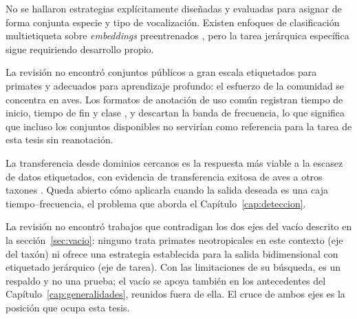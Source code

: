  No se hallaron estrategias explícitamente
diseñadas y evaluadas para asignar de forma conjunta especie y tipo de
vocalización. Existen enfoques de clasificación multietiqueta sobre
\textit{embeddings} preentrenados \citep{kath_leveraging_2024}, pero la tarea
jerárquica específica sigue requiriendo desarrollo propio.

 La revisión no encontró conjuntos públicos
a gran escala etiquetados para primates y adecuados para aprendizaje profundo:
el esfuerzo de la comunidad se concentra en aves. Los formatos de anotación de
uso común registran tiempo de inicio, tiempo de fin y clase
\citep{nolasco_learning_2023}, y descartan la banda de frecuencia, lo que
significa que incluso los conjuntos disponibles no servirían como referencia
para la tarea de esta tesis sin reanotación.

 La transferencia desde dominios cercanos es la
respuesta más viable a la escasez de datos etiquetados, con evidencia de
transferencia exitosa de aves a otros taxones
\citep{kath_leveraging_2024,nolasco_learning_2023}. Queda abierto cómo aplicarla
cuando la salida deseada es una caja tiempo--frecuencia, el problema que aborda
el
Capítulo~\ref{cap:deteccion}.

La revisión no encontró trabajos que contradigan los dos ejes del vacío descrito
en la sección~\ref{sec:vacio}: ninguno trata primates neotropicales en este
contexto (eje del taxón) ni ofrece una estrategia establecida para la salida
bidimensional con etiquetado jerárquico (eje de tarea). Con las limitaciones de
su búsqueda, es un respaldo y no una prueba; el vacío se apoya también en los
antecedentes del Capítulo~\ref{cap:generalidades}, reunidos fuera de ella. El
cruce de ambos ejes es la posición que ocupa esta tesis.


